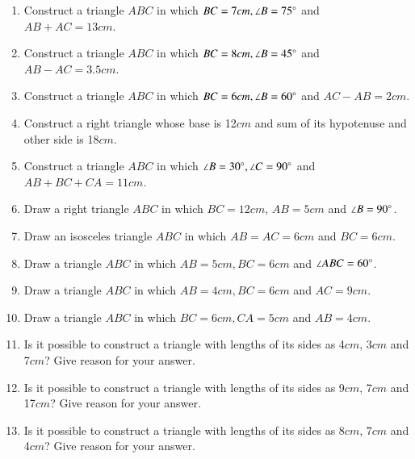 \begin{enumerate}[label=\thesubsection.\arabic*,ref=\thesubsection.\theenumi]
\item Construct a triangle $ABC$ in which $BC=7cm, \angle{B}=75\degree$ and $AB + AC = 13 cm$.
\label{chapters/9/11/2/1}
	\\
	\solution 

%
\item Construct a triangle $ABC$ in which $BC=8cm, \angle{B}=45\degree$ and $AB - AC = 3.5 cm$.
\label{chapters/9/11/2/2}
\\
\solution

%
\item Construct a triangle $ABC$ in which $BC=6cm, \angle{B}=60\degree$ and $AC - AB = 2cm$.
\label{chapters/9/11/2/3}
\\
\solution 

%
\item Construct a right triangle whose base is 12$cm$ and sum of its hypotenuse and other side is 18$cm$.
\label{chapters/9/11/2/5}
\\
\solution

%
\item Construct a triangle $ABC$ in which $\angle{B}=30\degree, \angle{C}=90\degree$ and  $AB+BC+CA=11cm$.
\label{chapters/9/11/2/4}
\\
\solution 

%
\item Draw a right triangle ${ABC}$ in which $BC=12 cm$, $AB=5 cm$ and $\angle{B}=90\degree$.
\item Draw an isosceles triangle ${ABC}$ in which $AB=AC=6cm$ and $BC =6cm$.
\item Draw a triangle ${ABC}$ in which $AB=5cm,BC=6cm$ and $\angle {ABC}=60\degree$.
\item Draw a triangle ${ABC}$ in which $AB=4cm, BC=6cm$ and $AC=9cm$.
\item Draw a triangle ${ABC}$ in which $BC=6 cm, CA=5 cm$ and $AB=4 cm$. 
\item Is it possible to construct a triangle with lengths of its sides as 4$cm$, 3$cm$ and 7$cm$? Give reason for your answer.

\item Is it possible to construct a triangle with lengths of its sides as 9$cm$, 7$cm$ and 17$cm$? Give reason for your answer.

\item Is it possible to construct a triangle with lengths of its sides as 8$cm$, 7$cm$ and 4$cm$? Give reason for your answer.


\end{enumerate}
